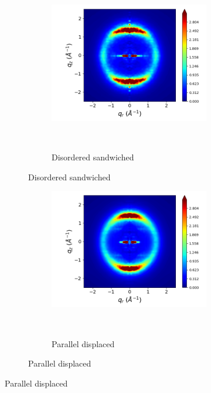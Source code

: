 \documentclass{article}
\begin{document}
\begin{figure}[htb]
\begin{subfigure}{0.28\linewidth}
			\begin{subfigure}{\textwidth}
		       		\centering
	        		\includegraphics[width=\linewidth]{rzplot_layered_300K_disorder_jet.png}
	        		\caption{Disordered sandwiched}~\label{fig:rzplot_layered_300K}
			\end{subfigure}
	\end{subfigure}
	\begin{subfigure}{0.28\linewidth}
	\centering
			\begin{subfigure}{\textwidth}
			\centering
		        	\includegraphics[width=\linewidth]{rzplot_offset_300K_jet.png}
			        \caption{Parallel displaced}~\label{fig:rzplot_offset_300K}
			\end{subfigure}
			

\end{subfigure}
\end{figure}
\end{document}
